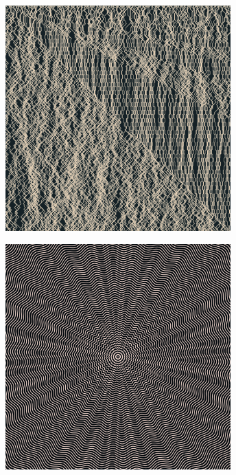 \documentclass[11pt,twoside]{book}
\begin{document}
\begin{figure}[!ht]
\includegraphics[width=246pt]{warm-grey-f5a508ec-24f7-431f-b95c-612b97db7a1c.png}
\end{figure}
\newpage
{}
\fancyfoot[CE,CO]{\fontsize{10}{12}\selectfont \thepage}
\begin{figure}[!ht]
\includegraphics[width=246pt]{candyfloss-b35bb9bc-92cd-4f84-9936-6630a03ad6c9.png}
\end{figure}
\newpage
{}
\fancyfoot[CE,CO]{\fontsize{10}{12}\selectfont \thepage}
\end{document}
